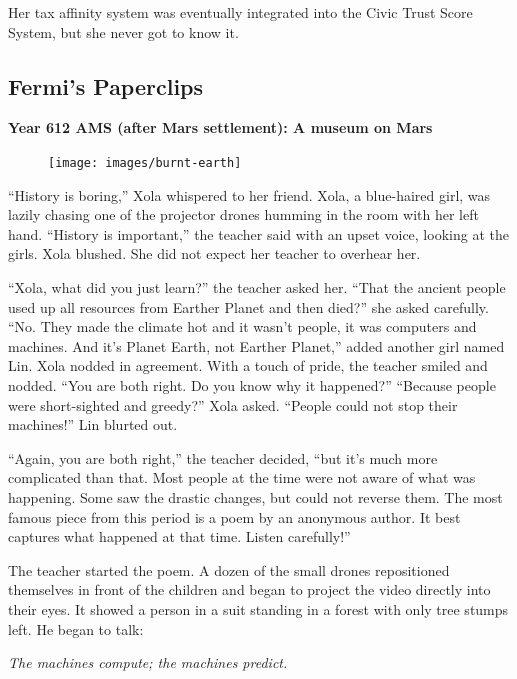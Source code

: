 \documentclass[12pt,]{krantz}
\begin{document}
Her tax affinity system was eventually integrated into the Civic Trust
Score System, but she never got to know it.

\subsection*{Fermi's Paperclips}\label{fermis-paperclips}


\textbf{Year 612 AMS (after Mars settlement): A museum on Mars}

\begin{figure}

{\centering \texttt{[image: images/burnt-earth]} 

}

\end{figure}

``History is boring,'' Xola whispered to her friend. Xola, a blue-haired
girl, was lazily chasing one of the projector drones humming in the room
with her left hand. ``History is important,'' the teacher said with an
upset voice, looking at the girls. Xola blushed. She did not expect her
teacher to overhear her.

``Xola, what did you just learn?'' the teacher asked her. ``That the
ancient people used up all resources from Earther Planet and then
died?'' she asked carefully. ``No. They made the climate hot and it
wasn't people, it was computers and machines. And it's Planet Earth, not
Earther Planet,'' added another girl named Lin. Xola nodded in
agreement. With a touch of pride, the teacher smiled and nodded. ``You
are both right. Do you know why it happened?'' ``Because people were
short-sighted and greedy?'' Xola asked. ``People could not stop their
machines!'' Lin blurted out.

``Again, you are both right,'' the teacher decided, ``but it's much more
complicated than that. Most people at the time were not aware of what
was happening. Some saw the drastic changes, but could not reverse them.
The most famous piece from this period is a poem by an anonymous author.
It best captures what happened at that time. Listen carefully!''

The teacher started the poem. A dozen of the small drones repositioned
themselves in front of the children and began to project the video
directly into their eyes. It showed a person in a suit standing in a
forest with only tree stumps left. He began to talk:

\emph{The machines compute; the machines predict.}
\end{document}
